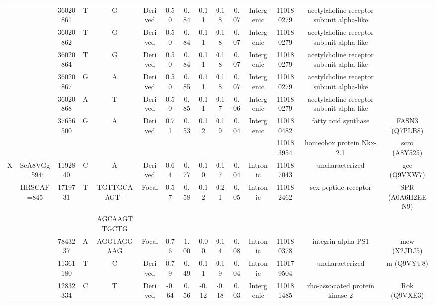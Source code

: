 \begin{landscape}
\begin{table}[!htp]
\begin{center}
\begin{tabular}{ccS[table-format=8.0]cccS[table-format=1.2]S[table-format=1.2]S[table-format=1.2]S[table-format=1.2]S[table-format=1.2]cccc}
  &  & 36020861 & T & G & Derived & 0.50 & 0.84 & 0.11 & 0.18 & 0.07 & Intergenic & 110180279 & acetylcholine receptor subunit alpha-like & \\
  &  & 36020862 & T & G & Derived & 0.50 & 0.84 & 0.11 & 0.18 & 0.07 & Intergenic & 110180279 & acetylcholine receptor subunit alpha-like & \\
  &  & 36020864 & T & G & Derived & 0.50 & 0.84 & 0.11 & 0.18 & 0.07 & Intergenic & 110180279 & acetylcholine receptor subunit alpha-like & \\
  &  & 36020867 & G & A & Derived & 0.50 & 0.85 & 0.11 & 0.18 & 0.07 & Intergenic & 110180279 & acetylcholine receptor subunit alpha-like & \\
  &  & 36020868 & A & T & Derived & 0.50 & 0.85 & 0.11 & 0.17 & 0.06 & Intergenic & 110180279 & acetylcholine receptor subunit alpha-like & \\
 &  & 37656500 & G & A & Derived & 0.71 & 0.53 & 0.12 & 0.19 & 0.04 & Intergenic & 110180482 & fatty acid synthase & FASN3 (Q7PLB8)\\
 &  &  &  &  &  &  &  &  &  &  &  & 110183954 & homeobox protein Nkx-2.1 & scro (A8Y525)\\
  \midrule
 X & ScA8VGg\_594; & 1192840 & C & A & Derived & 0.64 & 0.77 & 0.10 & 0.17 & 0.04 & Intronic & 110187043 & uncharacterized & gce (Q9VXW7)\\
 &  HRSCAF=845& 1719731 & T & TGTTGCAAGT - & Focal & 0.57 & 0.58 & 0.12 & 0.21 & 0.05 & Intronic & 110182462 & sex peptide receptor & SPR (A0A6H2EEN9)\\
 &  &  &  & AGCAAGTTGCTG &  &  &  &  &  &  &  &  & & \\[1ex]
 &  & 7843237 & A & AGGTAGGAAG & Focal & 0.76 & 1.00 & 0.00 & 0.14 & 0.08 & Intronic & 110180378 & integrin alpha-PS1 & mew (X2JDJ5)\\
 &  & 11361180 & T & C & Derived & 0.79 & 0.49 & 0.11 & 0.19 & 0.04 & Intronic & 110179504 & uncharacterized & m (Q9VYU8)\\
   &  & 12832334 &  C & T & Derived & -0.64 & 0.56 & -0.12 & -0.18 & 0.03 & Intergenic &  110181485  &  rho-associated protein kinase 2 & Rok (Q9VXE3)\\

\end{tabular}
\end{center}
\end{table}
\end{landscape}
